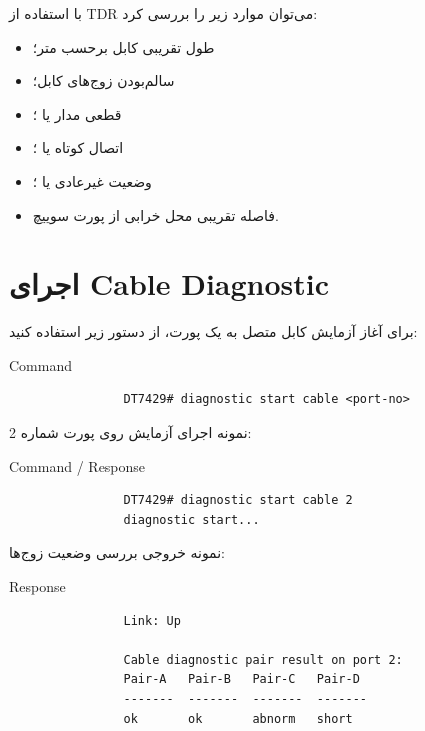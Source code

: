 \documentclass[11pt,letterpaper]{report}
\begin{document}
		با استفاده از TDR می‌توان موارد زیر را بررسی کرد:

		\begin{itemize}
			\item طول تقریبی کابل برحسب متر؛
			\item سالم‌بودن زوج‌های کابل؛
			\item قطعی مدار یا ؛
			\item اتصال کوتاه یا ؛
			\item وضعیت غیرعادی یا ؛
			\item فاصله تقریبی محل خرابی از پورت سوییچ.
		\end{itemize}


		\section{اجرای Cable Diagnostic}

		برای آغاز آزمایش کابل متصل به یک پورت، از دستور زیر استفاده کنید:

		\begin{latin}
			\begin{cliexample}{Command}
				\begin{verbatim}
				DT7429# diagnostic start cable <port-no>
				\end{verbatim}
			\end{cliexample}
		\end{latin}

		نمونه اجرای آزمایش روی پورت شماره 2:

		\begin{latin}
			\begin{cliexample}{Command / Response}
				\begin{verbatim}
				DT7429# diagnostic start cable 2
				diagnostic start...
				\end{verbatim}
			\end{cliexample}
		\end{latin}

		نمونه خروجی بررسی وضعیت زوج‌ها:

		\begin{latin}
			\begin{cliexample}{Response}
				\begin{verbatim}
				Link: Up

				Cable diagnostic pair result on port 2:
				Pair-A   Pair-B   Pair-C   Pair-D
				-------  -------  -------  -------
				ok       ok       abnorm   short
				\end{verbatim}
			\end{cliexample}
		\end{latin}
\end{document}
